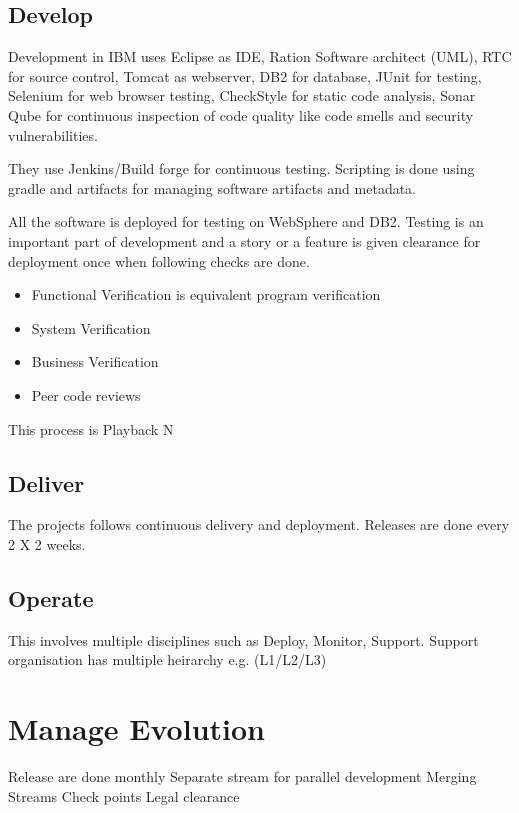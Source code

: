 \subsection{Develop}

Development in IBM uses Eclipse as IDE, Ration Software architect (UML), RTC for source control, Tomcat as webserver, DB2 for database, JUnit for testing, Selenium for web browser testing, CheckStyle for static code analysis, Sonar Qube for continuous inspection of code quality like code smells and security vulnerabilities.

They use Jenkins/Build forge for continuous testing. Scripting is done using gradle and artifacts for managing software artifacts and metadata.

All the software is deployed for testing on WebSphere and DB2. Testing is an important part of development and a story or a feature is given clearance for deployment once when following checks are done.

\begin{itemize}
    \item Functional Verification is equivalent program verification
    \item System Verification
    \item Business Verification
    \item Peer code reviews
\end{itemize}

This process is Playback N

\subsection{Deliver}

The projects follows continuous delivery and deployment. Releases are done every 2 X 2 weeks.

\subsection{Operate}

This involves multiple disciplines such as Deploy, Monitor, Support. Support organisation has multiple heirarchy e.g. (L1/L2/L3)

\section{Manage Evolution}

Release are done monthly
Separate stream for parallel development
Merging Streams
Check points
Legal clearance

